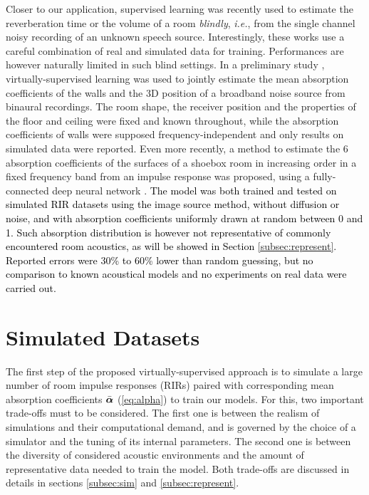 \documentclass[reprint]{JASA}
\def\alphavect{\mbox{\boldmath $\alpha$}}
\begin{document}
Closer to our application, supervised learning was recently used to estimate the reverberation time \cite{gamper2018blind} or the volume \cite{genovese2019blind} of a room \textit{blindly}, \textit{i.e.}, from the single channel noisy recording of an unknown speech source. Interestingly, these works use a careful combination of real and simulated data for training. Performances are however naturally limited in such blind settings. In a preliminary study \cite{kataria2017hearing}, virtually-supervised learning was used to jointly estimate the mean absorption coefficients of the walls and the 3D position of a broadband noise source from binaural recordings. The room shape, the receiver position and the properties of the floor and ceiling were fixed and known throughout, while the absorption coefficients of walls were supposed frequency-independent and only results on simulated data were reported. Even more recently, a method to estimate the 6 absorption coefficients of the surfaces of a shoebox room in increasing order in a fixed frequency band from an impulse response was proposed, using a fully-connected deep neural network \cite{yu2020room}. \textcolor{black}{The model was both trained and tested on simulated RIR datasets using the image source method, without diffusion or noise, and with absorption coefficients uniformly drawn at random between 0 and 1. Such absorption distribution is however not representative of commonly encountered room acoustics, as will be showed in Section \ref{subsec:represent}. Reported errors were 30\% to 60\% lower than random guessing, but no comparison to known acoustical models and no experiments on real data were carried out.}


\section{Simulated Datasets}
\label{sec:datasets}
The first step of the proposed virtually-supervised approach is to simulate a large number of room impulse responses (RIRs) paired with corresponding mean absorption coefficients $\bar{\alphavect}$ (\ref{eq:alpha}) to train our models. For this, two important trade-offs must to be considered. The first one is between the realism of simulations and their computational demand, and is governed by the choice of a simulator and the tuning of its internal parameters. 
The second one is between the diversity of considered acoustic environments and the amount of representative data needed to train the model. Both trade-offs are discussed in details in sections \ref{subsec:sim} and \ref{subsec:represent}.
\end{document}
